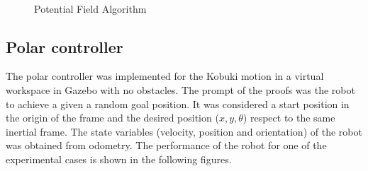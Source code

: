 \documentclass[conference]{IEEEtran}
\begin{document}
\begin{figure}[ht!]
  \centering
  ~\\
  \caption{Potential Field Algorithm} \label{f:apf}
\end{figure}

\subsection{Polar controller}

The polar controller was implemented for the Kobuki motion in a virtual workspace in Gazebo with no obstacles. The prompt of the proofs was the robot to achieve a given a random goal position.  It was considered a start position in the origin of the frame and the desired position ($x,y,\theta$) respect to the same inertial frame. The state variables (velocity, position and orientation) of the robot was obtained from odometry. The performance of the robot for one of the experimental cases is shown in the following figures.
\end{document}
